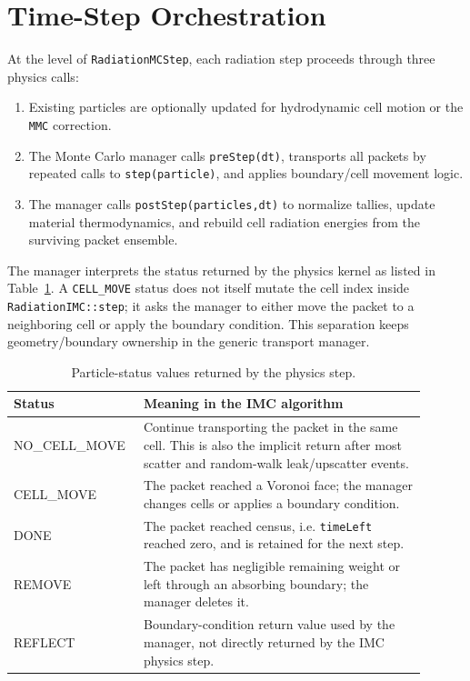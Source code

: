 \documentclass[11pt]{article}
\newcounter{algorithm}
\begin{document}
\section{Time-Step Orchestration}

At the level of \texttt{RadiationMCStep}, each radiation step proceeds through
three physics calls:
\begin{enumerate}
\item Existing particles are optionally updated for hydrodynamic cell motion or
the \texttt{MMC} correction.
\item The Monte Carlo manager calls \texttt{preStep(dt)}, transports all
packets by repeated calls to \texttt{step(particle)}, and applies boundary/cell
movement logic.
\item The manager calls \texttt{postStep(particles,dt)} to normalize tallies,
update material thermodynamics, and rebuild cell radiation energies from the
surviving packet ensemble.
\end{enumerate}

The manager interprets the status returned by the physics kernel as listed in
Table~\ref{tab:events}. A \texttt{CELL\_MOVE} status does not itself mutate the
cell index inside \texttt{RadiationIMC::step}; it asks the manager to either
move the packet to a neighboring cell or apply the boundary condition. This
separation keeps geometry/boundary ownership in the generic transport manager.

\begin{table}[htbp]
\centering
\caption{Particle-status values returned by the physics step.}
\label{tab:events}
\begin{tabular}{>{\ttfamily}p{0.25\linewidth}p{0.65\linewidth}}
\toprule
Status & Meaning in the IMC algorithm \\
\midrule
NO\_CELL\_MOVE & Continue transporting the packet in the same cell. This is also the implicit return after most scatter and random-walk leak/upscatter events. \\
CELL\_MOVE & The packet reached a Voronoi face; the manager changes cells or applies a boundary condition. \\
DONE & The packet reached census, i.e. \texttt{timeLeft} reached zero, and is retained for the next step. \\
REMOVE & The packet has negligible remaining weight or left through an absorbing boundary; the manager deletes it. \\
REFLECT & Boundary-condition return value used by the manager, not directly returned by the IMC physics step. \\
\bottomrule
\end{tabular}
\end{table}
\end{document}
